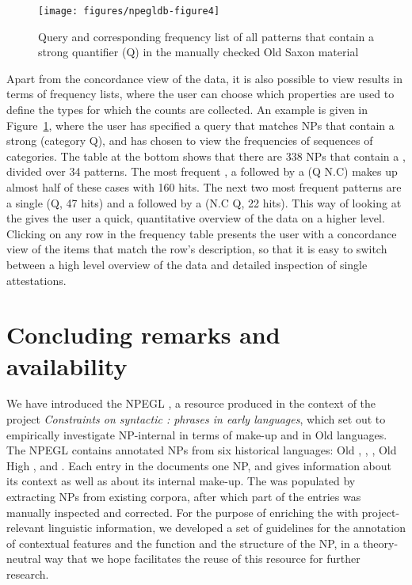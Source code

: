 \documentclass[output=paper,colorlinks,citecolor=brown]{langscibook}
\begin{document}
\begin{figure}[tb]
\texttt{[image: figures/npegldb-figure4]}
\caption{Query and corresponding frequency list of all patterns that contain a strong quantifier (Q) in the manually checked Old Saxon material\label{fig:korp_samman}}
\end{figure}

Apart from the concordance view of the data, it is also possible to view results in terms of frequency lists, where the user can choose which properties are used to define the types for which the counts are collected. An example is given in Figure~\ref{fig:korp_samman}, where the user has specified a query that matches NPs that contain a strong  (category Q), and has chosen to view the frequencies of sequences of categories. The table at the bottom shows that there are 338 NPs that contain a , divided over 34 patterns. The most frequent , a  followed by a  (Q N.C) makes up almost half of these cases with 160 hits. The next two most frequent patterns are a single  (Q, 47 hits) and a  followed by a  (N.C Q, 22 hits). This way of looking at the  gives the  user a quick, quantitative overview of the data on a higher level. Clicking on any row in the frequency table presents the user with a concordance view of the items that match the row's description, so that it is easy to switch between a high level overview of the data and detailed inspection of single attestations.

\section{Concluding remarks and availability}\label{sec:sum}\label{sec:availability}\largerpage[2]

We have introduced the NPEGL , a resource produced in the context of the project \textit{Constraints on syntactic :  phrases in early  languages}, which set out to empirically investigate NP-internal  in terms of make-up and  in Old  languages. The NPEGL  contains annotated NPs from six historical languages: Old , , , Old High ,  and . Each entry in the  documents one NP, and gives information about its context as well as about its internal make-up. The  was populated by extracting NPs from existing corpora, after which part of the entries was manually inspected and  corrected. For the purpose of enriching the  with project-relevant linguistic information, we developed a set of guidelines for the annotation of contextual features and the function and the structure of the NP, in a theory-neutral way that we hope facilitates the reuse of this resource for further research.
\end{document}

